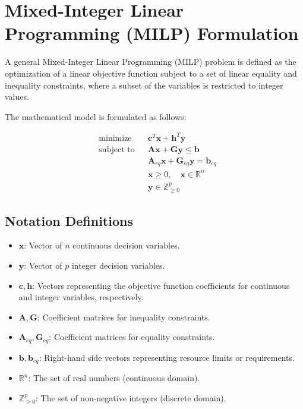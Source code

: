 \documentclass[12pt,a4paper]{article}
\begin{document}
	
	\section{Mixed-Integer Linear Programming (MILP) Formulation}
	
	A general Mixed-Integer Linear Programming (MILP) problem is defined as the optimization of a linear objective function subject to a set of linear equality and inequality constraints, where a subset of the variables is restricted to integer values.
	
	The mathematical model is formulated as follows:
	
	\begin{equation*}
		\begin{aligned}
			& \text{minimize} && \mathbf{c}^T \mathbf{x} + \mathbf{h}^T \mathbf{y} \\
			& \text{subject to} && \mathbf{A}\mathbf{x} + \mathbf{G}\mathbf{y} \leq \mathbf{b} \\
			& && \mathbf{A}_{eq}\mathbf{x} + \mathbf{G}_{eq}\mathbf{y} = \mathbf{b}_{eq} \\
			& && \mathbf{x} \geq 0, \quad \mathbf{x} \in \mathbb{R}^n \\
			& && \mathbf{y} \in \mathbb{Z}^p_{\geq 0}
		\end{aligned}
	\end{equation*}
	
	\subsection{Notation Definitions}
	\begin{itemize}
		\item $\mathbf{x}$: Vector of $n$ continuous decision variables.
		\item $\mathbf{y}$: Vector of $p$ integer decision variables.
		\item $\mathbf{c}, \mathbf{h}$: Vectors representing the objective function coefficients for continuous and integer variables, respectively.
		\item $\mathbf{A}, \mathbf{G}$: Coefficient matrices for inequality constraints.
		\item $\mathbf{A}_{eq}, \mathbf{G}_{eq}$: Coefficient matrices for equality constraints.
		\item $\mathbf{b}, \mathbf{b}_{eq}$: Right-hand side vectors representing resource limits or requirements.
		\item $\mathbb{R}^n$: The set of real numbers (continuous domain).
		\item $\mathbb{Z}^p_{\geq 0}$: The set of non-negative integers (discrete domain).
	\end{itemize}
	
\end{document}

